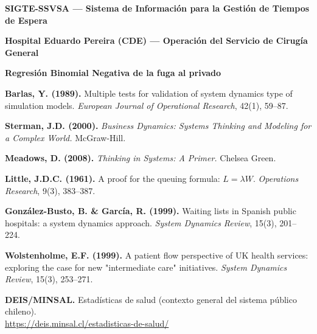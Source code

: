 \documentclass[12pt,a4paper]{article}
\begin{document}
\begin{enumerate}[leftmargin=1.5cm,label=\textbf{[\arabic*]}]

\item \label{ref:sigte} \textbf{SIGTE-SSVSA — Sistema de Información para la Gestión de Tiempos de Espera}

\item \label{ref:cde} \textbf{Hospital Eduardo Pereira (CDE) — Operación del Servicio de Cirugía General}

\item \label{ref:nb} \textbf{Regresión Binomial Negativa de la fuga al privado}

\item \textbf{Barlas, Y. (1989).} Multiple tests for validation of system dynamics type of
  simulation models. \textit{European Journal of Operational Research}, 42(1), 59--87.

\item \textbf{Sterman, J.D. (2000).} \textit{Business Dynamics: Systems Thinking and Modeling
  for a Complex World.} McGraw-Hill.

\item \textbf{Meadows, D. (2008).} \textit{Thinking in Systems: A Primer.} Chelsea Green.

\item \textbf{Little, J.D.C. (1961).} A proof for the queuing formula: $L=\lambda W$.
  \textit{Operations Research}, 9(3), 383--387.

\item \textbf{González-Busto, B. \& García, R. (1999).} Waiting lists in Spanish public
  hospitals: a system dynamics approach. \textit{System Dynamics Review}, 15(3), 201--224.

\item \textbf{Wolstenholme, E.F. (1999).} A patient flow perspective of UK health services:
  exploring the case for new "intermediate care" initiatives.
  \textit{System Dynamics Review}, 15(3), 253--271.

\item \textbf{DEIS/MINSAL.} Estadísticas de salud (contexto general del sistema público chileno).\\
  \url{https://deis.minsal.cl/estadisticas-de-salud/}

\end{enumerate}
\end{document}
